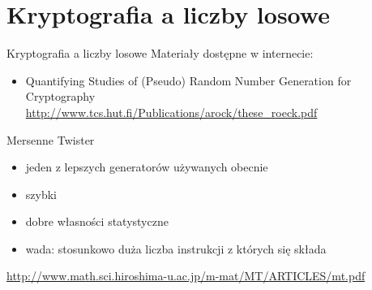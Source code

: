 \section{Kryptografia a liczby losowe}
\begin{frame}{Kryptografia a liczby losowe}
	Materiały dostępne w internecie:
	\begin{itemize}
		\item Quantifying Studies of (Pseudo) Random Number Generation for Cryptography\\
		\url{http://www.tcs.hut.fi/Publications/arock/these_roeck.pdf}
	\end{itemize}
	\end{frame}
	\begin{frame}{Mersenne Twister}
	\begin{itemize}
	 \item jeden z lepszych generatorów używanych obecnie 
	 \item  szybki 
	 \item dobre własności statystyczne  \item wada: stosunkowo duża liczba instrukcji z których się składa
	\end{itemize}
	
	\url{http://www.math.sci.hiroshima-u.ac.jp/m-mat/MT/ARTICLES/mt.pdf}
	
\end{frame}